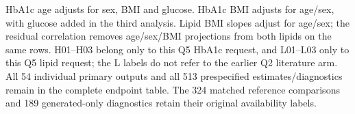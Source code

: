 \documentclass[11pt,letterpaper]{article}
\begin{document}
\endgroup

HbA1c age adjusts for sex, BMI and glucose. HbA1c BMI adjusts for age/\allowbreak{}sex, with glucose added in the third analysis. Lipid BMI slopes adjust for age/\allowbreak{}sex; the residual correlation removes age/\allowbreak{}sex/\allowbreak{}BMI projections from both lipids on the same rows. H01–\allowbreak{}H03 belong only to this Q5 HbA1c request, and L01–\allowbreak{}L03 only to this Q5 lipid request; the L labels do not refer to the earlier Q2 literature arm. All 54 individual primary outputs and all 513 prespecified estimates/\allowbreak{}diagnostics remain in the complete endpoint table. The 324 matched reference comparisons and 189 generated-only diagnostics retain their original availability labels.


\begingroup

\small

\renewcommand{\arraystretch}{1.22}
\end{document}
